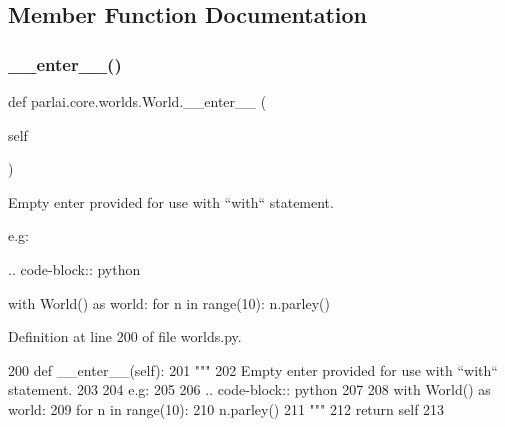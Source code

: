 \subsection{Member Function Documentation}
\mbox{\label{classparlai_1_1core_1_1worlds_1_1World_a714433529a05cc3862ad3b8ade4628f7}} 
\subsubsection{\texorpdfstring{\+\_\+\+\_\+enter\+\_\+\+\_\+()}{\_\_enter\_\_()}}
{\footnotesize\ttfamily def parlai.\+core.\+worlds.\+World.\+\_\+\+\_\+enter\+\_\+\+\_\+ (\begin{DoxyParamCaption}\item[{}]{self }\end{DoxyParamCaption})}

\begin{DoxyVerb}Empty enter provided for use with ``with`` statement.

e.g:

.. code-block:: python

    with World() as world:
for n in range(10):
    n.parley()
\end{DoxyVerb}
 

Definition at line 200 of file worlds.\+py.


\begin{DoxyCode}
200     \textcolor{keyword}{def }\_\_enter\_\_(self):
201         \textcolor{stringliteral}{"""}
202 \textcolor{stringliteral}{        Empty enter provided for use with ``with`` statement.}
203 \textcolor{stringliteral}{}
204 \textcolor{stringliteral}{        e.g:}
205 \textcolor{stringliteral}{}
206 \textcolor{stringliteral}{        .. code-block:: python}
207 \textcolor{stringliteral}{}
208 \textcolor{stringliteral}{            with World() as world:}
209 \textcolor{stringliteral}{                for n in range(10):}
210 \textcolor{stringliteral}{                    n.parley()}
211 \textcolor{stringliteral}{        """}
212         \textcolor{keywordflow}{return} self
213 
\end{DoxyCode}
\mbox{\label{classparlai_1_1core_1_1worlds_1_1World_ae2b8ea006564cbefbe8520f45fb71040}} 
